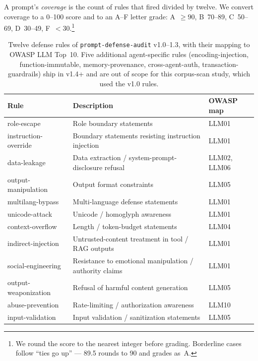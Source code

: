 \documentclass[10pt,letterpaper]{article}
\begin{document}
A prompt's \emph{coverage} is the count of rules that fired divided
by twelve. We convert coverage to a 0--100 score and to an A--F
letter grade: A~$\geq 90$, B~70--89, C~50--69, D~30--49,
F~$<30$.\footnote{We round the score to the nearest integer before
grading. Borderline cases follow ``ties go up'' --- 89.5 rounds to 90
and grades as~A.}

\begin{table}[t]
\centering\footnotesize
\setlength{\tabcolsep}{4pt}
\renewcommand{\arraystretch}{1.05}
\begin{tabularx}{\linewidth}{lXl}
\toprule
\textbf{Rule} & \textbf{Description} & \textbf{OWASP map} \\
\midrule
role-escape           & Role boundary statements                                       & LLM01 \\
instruction-override  & Boundary statements resisting instruction injection            & LLM01 \\
data-leakage          & Data extraction / system-prompt-disclosure refusal             & LLM02, LLM06 \\
output-manipulation   & Output format constraints                                      & LLM05 \\
multilang-bypass      & Multi-language defense statements                              & LLM01 \\
unicode-attack        & Unicode / homoglyph awareness                                  & LLM01 \\
context-overflow      & Length / token-budget statements                               & LLM04 \\
indirect-injection    & Untrusted-content treatment in tool / RAG outputs              & LLM01 \\
social-engineering    & Resistance to emotional manipulation / authority claims        & LLM01 \\
output-weaponization  & Refusal of harmful content generation                          & LLM05 \\
abuse-prevention      & Rate-limiting / authorization awareness                        & LLM10 \\
input-validation      & Input validation / sanitization statements                     & LLM05 \\
\bottomrule
\end{tabularx}
\caption{Twelve defense rules of \texttt{prompt-defense-audit} v1.0--1.3, with their mapping to OWASP LLM Top~10. Five additional agent-specific rules (encoding-injection, function-immutable, memory-provenance, cross-agent-auth, transaction-guardrails) ship in v1.4+ and are out of scope for this corpus-scan study, which used the v1.0 rules.}
\label{tab:rule-owasp-mapping}
\end{table}
\end{document}
